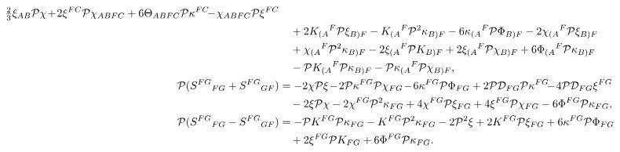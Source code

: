 \documentclass[10pt,a4paper]{article}
\theoremstyle{plain}
\begin{document}
\begin{subequations}
\begin{align}
 \tfrac{2}{3}\xi_{AB}\mathcal{P}\chi\hspace{-0.5mm} +\hspace{-0.5mm}
 2\xi^{FC}\mathcal{P}\chi_{ABFC}
 +6\Theta_{ABFC}\mathcal{P}\kappa^{FC}\hspace{-1.5mm}-\hspace{-0.5mm}
\chi_{ABFC}\mathcal{P}\xi^{FC}
 \nonumber \\ & \quad +
 2K_{(A}{}^{F}\mathcal{P}\xi_{B)F}-K_{(A}{}^{F}\mathcal{P}^{2}\kappa_{B)F}
 -6\kappa_{(A}{}^{F}\mathcal{P}\Phi_{B)F}-2\chi_{(A}{}^{F}\mathcal{P}\xi_{B)F}
 \nonumber \\ & \quad +\chi_{(A}{}^{F}\mathcal{P}^{2}\kappa_{B)F}
 -2\xi_{(A}{}^{F}\mathcal{P}K_{B)F}+2\xi_{(A}{}{}^{F}\mathcal{P}\chi_{B)F}
+6\Phi_{(A}{}^{F}\mathcal{P}\kappa_{B)F}
 \nonumber \\ & \quad
 -\mathcal{P}K_{(A}{}^{F}\mathcal{P}\kappa_{B)F}
-\mathcal{P}\kappa_{(A}{}^{F}\mathcal{P}\chi_{B)F},
\label{PSIntrinsicInBrute2}
\\
\mathcal{P}(S^{FG}{}_{FG} + S^{FG}{}_{GF}) &=-2\chi\mathcal{P}\xi
\hspace{-0.5mm} - \hspace{-0.5mm}
2\mathcal{P}\kappa^{FG}\mathcal{P}\chi_{FG}
\hspace{-0.5mm}-\hspace{-0.5mm}
6\kappa^{FG}\mathcal{P}\Phi_{FG}+2\mathcal{P}\mathcal{D}_{FG}\mathcal{P}\kappa^{FG}
\hspace{-1.5mm}- \hspace{-0.5mm}4\mathcal{P}\mathcal{D}_{FG}\xi^{FG}
\nonumber \\ & \quad - 2\xi\mathcal{P}\chi
-2\chi^{FG}\mathcal{P}^{2}\kappa_{FG}+4\chi^{FG}\mathcal{P}\xi_{FG}
+4\xi^{FG}\mathcal{P}\chi_{FG}-6\Phi^{FG}\mathcal{P}\kappa_{FG},
\label{PSIntrinsicInBrute3}
\\
\mathcal{P}(S^{FG}{}_{FG} - S^{FG}{}_{GF})
&=-\mathcal{P}K^{FG}\mathcal{P}\kappa_{FG}-K^{FG}\mathcal{P}^{2}\kappa_{FG}-2\mathcal{P}^{2}\xi+2K^{FG}\mathcal{P}\xi_{FG}
+ 6\kappa^{FG}\mathcal{P}\Phi_{FG} \nonumber \\ & \quad
+2\xi^{FG}\mathcal{P}K_{FG} + 6\Phi^{FG}\mathcal{P}\kappa_{FG}.
\label{PSIntrinsicInBrute4}
\end{align}
\end{subequations}
\end{document}
